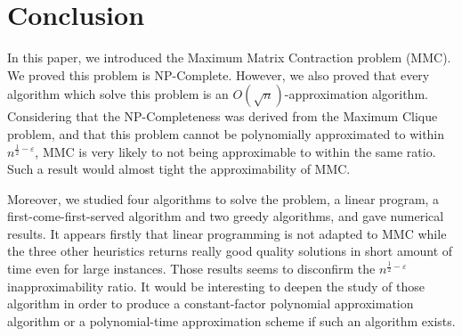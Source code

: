 \section{Conclusion}

In this paper, we introduced the Maximum Matrix Contraction problem (MMC). 
We proved this problem is NP-Complete. However, we also proved that every algorithm which solve this problem is an $O(\sqrt{n})$-approximation algorithm. Considering that the NP-Completeness was derived from the Maximum Clique problem, and that this problem cannot be polynomially approximated to within $n^{\frac{1}{2}-\varepsilon}$, MMC is very likely to not being approximable to within the same ratio. Such a result would almost tight the approximability of MMC.

Moreover, we studied four algorithms to solve the problem, a linear program, a first-come-first-served algorithm and two greedy algorithms, and gave numerical results. It appears firstly that linear programming is not adapted to MMC while the three other heuristics returns really good quality solutions in short amount of time even for large instances. Those results seems to disconfirm the $n^{\frac{1}{2}-\varepsilon}$ inapproximability ratio. It would be interesting to deepen the study of those algorithm in order to produce a constant-factor polynomial approximation algorithm or a polynomial-time approximation scheme if such an algorithm exists.